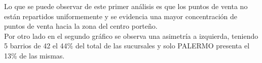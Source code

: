 \begin{figure}[h]
\end{figure}


Lo que se puede observar de este primer análisis es que los puntos de venta no están repartidos uniformemente y se evidencia una mayor concentración de puntos de venta hacia la zona del centro porteño.\\
Por otro lado en el segundo gráfico se observa una asimetría a izquierda, teniendo 5 barrios de 42 el 44\% del total de las sucursales y solo PALERMO presenta el 13\% de las mismas.\\



